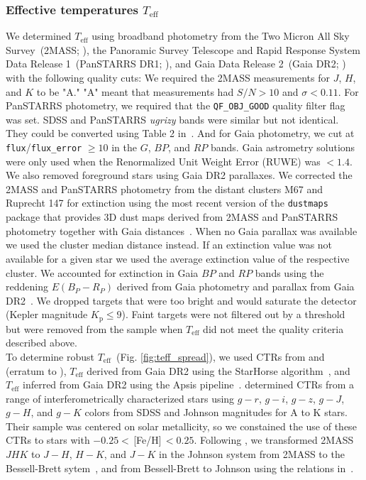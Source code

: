 \documentclass{aa}
\begin{document}
\subsubsection{Effective temperatures $T_\mathrm{eff}$}
\label{sec:sec:sec:teff}
We determined $T_\mathrm{eff}$ using broadband photometry from the Two Micron All Sky Survey~(2MASS; \citealt{skrutskie_two_2006}), the Panoramic Survey Telescope and Rapid Response System Data Release 1~(PanSTARRS DR1; \citealt{2016arXiv161205560C}), and Gaia Data Release 2~(Gaia DR2; \citealt{gaia2016, gaia2018}) with the following quality cuts: We required the 2MASS measurements for $J$, $H$, and $K$ to be "A." "A" meant that measurements had $S/N>10$ and $\sigma<0.11$. For PanSTARRS photometry, we required that the \texttt{QF\_OBJ\_GOOD} quality filter flag was set. SDSS and PanSTARRS \textit{ugrizy} bands were similar but not identical. They could be converted using Table 2 in~\citet{finkbeiner_ps1tosdss_2016}. And for Gaia photometry, we cut at \texttt{flux}/\texttt{flux\_error} $\geq 10$ in the $G$, $BP$, and $RP$ bands. Gaia astrometry solutions were only used when the Renormalized Unit Weight Error (RUWE) was $<1.4$. We also removed foreground stars using Gaia DR2 parallaxes. We corrected the 2MASS and PanSTARRS photometry from the distant clusters M67 and Ruprecht 147 for extinction using the most recent version of the \texttt{dustmaps}~\citep{green_dustmaps_2018} package that provides 3D dust maps derived from 2MASS and PanSTARRS photometry together with Gaia distances~\citep{green2019}. When no Gaia parallax was available we used the cluster median distance instead. If an extinction value was not available for a given star we used the average extinction value of the respective cluster. We accounted for extinction in Gaia $BP$ and $RP$ bands using the reddening $E(B_P-R_P)$ derived from Gaia photometry and parallax from Gaia DR2~\citep{andrae_gaiaapsis_2018}. We dropped targets that were too bright and would saturate the detector (Kepler magnitude $K_\mathrm{p} \leq 9$). Faint targets were not filtered out by a threshold but were removed from the sample when $T_\mathrm{eff}$ did not meet the quality criteria described above.
\\
To determine robust $T_\mathrm{eff}$~(Fig. \ref{fig:teff_spread}), we used CTRs from \citet{boyajian_stellar_2013} and \citet{mann_erratum_2016} (erratum to \citealt{mann_how_2015}), $T_\mathrm{eff}$ derived from Gaia DR2 using the StarHorse algorithm~\citep{queiroz_starhorse_2018}, and $T_\mathrm{eff}$ inferred from Gaia DR2 using the Apsis pipeline~\citep{bailerjones_apsis_2013, andrae_gaiaapsis_2018}. \citet{boyajian_stellar_2013} determined CTRs from a range of interferometrically characterized stars using $g-r$, $g-i$, $g-z$, $g-J$, $g-H$, and $g-K$ colors from SDSS and Johnson magnitudes for A to K stars. Their sample was centered on solar metallicity, so we constained the use of these CTRs to stars with $-0.25<$\,[Fe/H]$\,<0.25$. Following \citet{boyajian_stellar_2013}, we transformed 2MASS $JHK$ to $J-H$, $H-K$, and $J-K$ in the Johnson system from 2MASS to the Bessell-Brett sytem~\citep{carpenter_color_2001}, and from Bessell-Brett to Johnson using the relations in~\citet{bessell_brett_1988}. 
\end{document}
